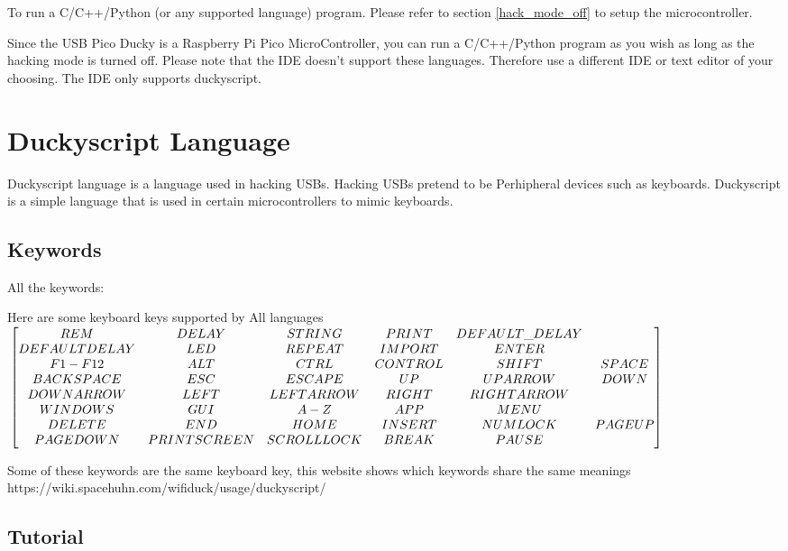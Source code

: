 \documentclass[a4paper,12pt]{article}
\begin{document}
To run a C/C++/Python (or any supported language) program. Please refer to section \ref{hack_mode_off} to setup the microcontroller.

Since the USB Pico Ducky is a Raspberry Pi Pico MicroController, you can run a C/C++/Python program as you wish as long as the hacking mode is turned off. Please note that the IDE doesn't support these languages. Therefore use a different IDE or text editor of your choosing. The IDE only supports duckyscript.

\section{Duckyscript Language}

Duckyscript language is a language used in hacking USBs. Hacking USBs pretend to be Perhipheral devices such as keyboards. Duckyscript is a simple language that is used in certain microcontrollers to mimic keyboards.

\subsection{Keywords}\label{all_keywords}

All the keywords:

Here are some keyboard keys supported by All languages
\scriptsize
$\\\begin{bmatrix} 
REM & DELAY & STRING & PRINT & DEFAULT\_DELAY
\\DEFAULTDELAY & LED & REPEAT & IMPORT & ENTER
\\F1-F12 & ALT & CTRL & CONTROL & SHIFT & SPACE
\\BACKSPACE & ESC & ESCAPE & UP & UPARROW & DOWN
\\DOWNARROW & LEFT & LEFTARROW & RIGHT & RIGHTARROW
\\WINDOWS & GUI & A-Z & APP & MENU
\\DELETE & END & HOME & INSERT & NUMLOCK & PAGEUP
\\PAGEDOWN & PRINTSCREEN & SCROLLLOCK & BREAK & PAUSE
\end{bmatrix}\\\\$
\normalsize

Some of these keywords are the same keyboard key, this website shows which keywords share the same meanings
https://wiki.spacehuhn.com/wifiduck/usage/duckyscript/

\subsection{Tutorial}
\end{document}
